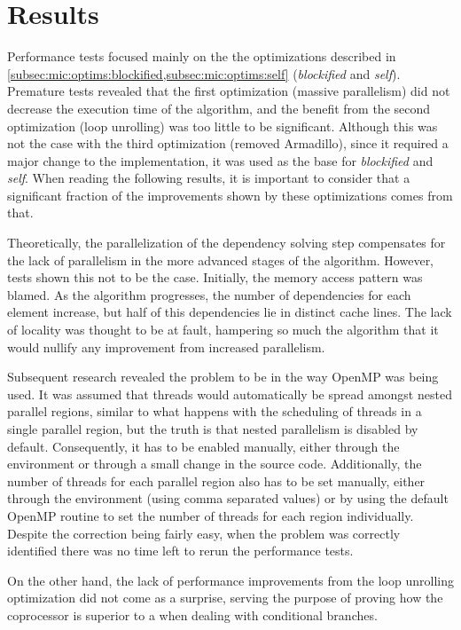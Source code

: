 \documentclass[../thesis]{subfiles}
\begin{document}
	\section{Results}
	\label{sec:mic:results}

	Performance tests focused mainly on the the optimizations described in \cref{subsec:mic:optims:blockified,subsec:mic:optims:self} (\emph{blockified} and \emph{self}). Premature tests revealed that the first optimization (massive parallelism) did not decrease the execution time of the algorithm, and the benefit from the second optimization (loop unrolling) was too little to be significant. Although this was not the case with the third optimization (removed Armadillo), since it required a major change to the implementation, it was used as the base for \emph{blockified} and \emph{self}. When reading the following results, it is important to consider that a significant fraction of the improvements shown by these optimizations comes from that.

	Theoretically, the parallelization of the dependency solving step compensates for the lack of parallelism in the more advanced stages of the algorithm. However, tests shown this not to be the case. Initially, the memory access pattern was blamed. As the algorithm progresses, the number of dependencies for each element increase, but half of this dependencies lie in distinct cache lines. The lack of locality was thought to be at fault, hampering so much the algorithm that it would nullify any improvement from increased parallelism.

	Subsequent research \cite{PRACE:MIC:BestPracticeGuide} revealed the problem to be in the way OpenMP was being used. It was assumed that threads would automatically be spread amongst nested parallel regions, similar to what happens with the scheduling of threads in a single parallel region, but the truth is that nested parallelism is disabled by default. Consequently, it has to be enabled manually, either through the environment or through a small change in the source code. Additionally, the number of threads for each parallel region also has to be set manually, either through the environment (using comma separated values) or by using the default OpenMP routine to set the number of threads for each region individually. Despite the correction being fairly easy, when the problem was correctly identified there was no time left to rerun the performance tests.

	On the other hand, the lack of performance improvements from the loop unrolling optimization did not come as a surprise, serving the purpose of proving how the \intel\xeonphi coprocessor is superior to a \gpu when dealing with conditional branches.
\end{document}
